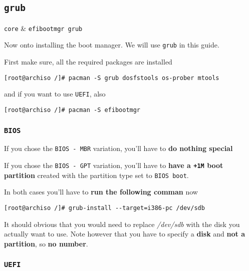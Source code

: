 \documentclass[10pt]{dustdoc}
\begin{document}
\subsection{\texttt{grub}}
\label{sec:grub}

\begin{packagetable}
    \texttt{core} & \texttt{efibootmgr grub} \\
\end{packagetable}

Now onto installing the boot manager.
We will use \texttt{grub} in this guide.

First make sure, all the required packages are installed

\begin{verbatim}
[root@archiso /]# pacman -S grub dosfstools os-prober mtools
\end{verbatim}

\noindent
and if you want to use \texttt{UEFI}, also

\begin{verbatim}
[root@archiso /]# pacman -S efibootmgr
\end{verbatim}

\subsubsection{\texttt{BIOS}}
\label{sec:bios}

If you chose the \texttt{BIOS - MBR} variation, you’ll have to \textbf{do nothing special}

If you chose the \texttt{BIOS - GPT} variation, you’ll have to \textbf{have a \texttt{+1M} boot partition} created with the partition type set to \texttt{BIOS boot}.

In both cases you’ll have to \textbf{run the following comman} now

\begin{verbatim}
[root@archiso /]# grub-install --target=i386-pc /dev/sdb
\end{verbatim}

\begin{NOTE}
    It should obvious that you would need to replace \textit{/dev/sdb} with the disk you actually want to use.
    Note however that you have to specify a \textbf{disk} and \textbf{not a partition}, so \textbf{no number}.
\end{NOTE}

\subsubsection{\texttt{UEFI}}
\label{sec:uefi}
\end{document}
